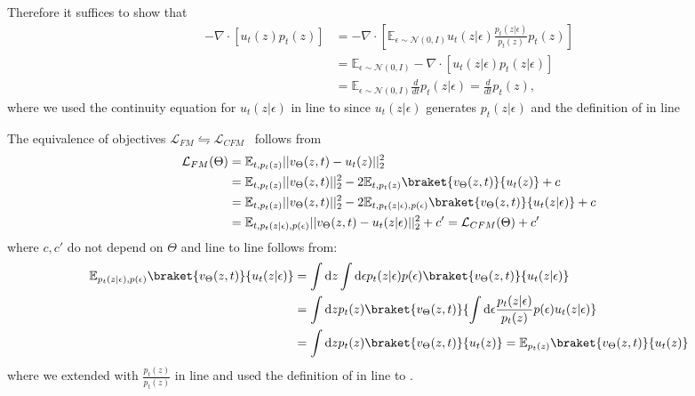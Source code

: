 Therefore it suffices to show that
\begin{align}
    - \nabla \cdot [u_t(z) p_t(z)]
      &=
    - \nabla \cdot [\mathbb{E}_{\epsilon \sim
   \mathcal{N}(0,I)} u_t(z \vert \epsilon) \frac{p_t(z \vert
   \epsilon)}{p_t(z)}  p_t(z) ] \label{eq:marg_cont_line1}\\
     &=  \mathbb{E}_{\epsilon \sim \mathcal{N}(0,I)} - \nabla \cdot  [u_t(z \vert \epsilon) p_t(z \vert \epsilon) ] \label{eq:marg_cont_line2} \\
     &= \mathbb{E}_{\epsilon \sim \mathcal{N}(0,I)}  \frac{d}{dt} p_t(z \vert \epsilon) \label{eq:marg_cont_line3}  = \frac{d}{dt} p_t(z),
 \end{align}
 where we used the continuity equation  for $u_t(z \vert \epsilon)$ in line  to  since $u_t(z \vert \epsilon)$ generates $p_t(z \vert \epsilon)$ and the definition of  in line 

 The equivalence of objectives $\mathcal{L}_{FM} \leftrightharpoons \mathcal{L}_{CFM}$~\citep{lipman2023flow} follows from
 \begin{align}
 \mathcal{L}_{FM}(\Theta) &= \mathbb{E}_{t, p_t(z)}|| v_{\Theta}(z, t) - u_t(z)  ||_2^2 \\
     &=  \mathbb{E}_{t, p_t(z)}|| v_{\Theta}(z, t) ||_2^2  - 2 \mathbb{E}_{t, p_t(z)} \braket{v_{\Theta}(z, t) }{  u_t(z) } + c
     \label{eq:equiv_line2} \\
       &=\mathbb{E}_{t, p_t(z)}|| v_{\Theta}(z, t) ||_2^2  - 2 \mathbb{E}_{t, p_t(z | \epsilon),  p(\epsilon) } \braket{v_{\Theta}(z, t) }{u_t(z | \epsilon )} + c \label{eq:equiv_line3} \\
      &=   \mathbb{E}_{t, p_t(z | \epsilon), p(\epsilon) }|| v_{\Theta}(z, t) - u_t(z | \epsilon)  ||_2^2 + c'  =   \mathcal{L}_{CFM}(\Theta) + c'
 \end{align}
 where $c, c'$ do not depend on $\Theta$ and line  to line  follows from:
 \begin{align}
 \mathbb{E}_{p_t(z | \epsilon),  p(\epsilon) } \braket{v_{\Theta}(z, t) }{u_t(z | \epsilon )}
 &=  \int \diff z  \int \diff \epsilon p_t(z | \epsilon) p(\epsilon)\braket{v_{\Theta}(z, t) }{u_t(z | \epsilon )} \\
 &=  \int \diff z p_t(z) \braket{v_{\Theta}(z, t) }{ \int \diff \epsilon \frac{ p_t(z| \epsilon)}{p_t(z)} p(\epsilon) u_t(z | \epsilon )} \label{eq:equiv_intergral_line2} \\
%
 &=  \int \diff z p_t(z)  \braket{v_{\Theta}(z, t) }{  u_t(z) } =  \mathbb{E}_{p_t(z)} \braket{v_{\Theta}(z, t) }{  u_t(z) } \label{eq:equiv_intergral_line3} 
 \end{align}
 where we extended with $\frac{p_t(z)}{p_t(z)}$ in line  and used the definition of  in line  to .

